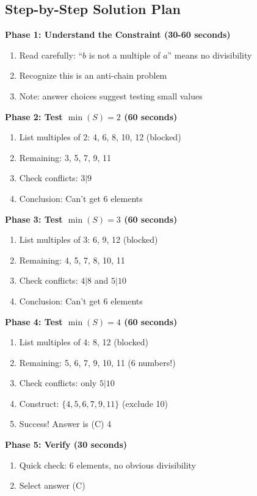 \documentclass[12pt]{article}
\begin{document}
\begin{roadmapbox}
\subsection*{Step-by-Step Solution Plan}

\textbf{Phase 1: Understand the Constraint (30-60 seconds)}
\begin{enumerate}
    \item Read carefully: ``$b$ is not a multiple of $a$'' means no divisibility
    \item Recognize this is an anti-chain problem
    \item Note: answer choices suggest testing small values
\end{enumerate}

\textbf{Phase 2: Test $\min(S) = 2$ (60 seconds)}
\begin{enumerate}
    \item List multiples of 2: 4, 6, 8, 10, 12 (blocked)
    \item Remaining: 3, 5, 7, 9, 11
    \item Check conflicts: $3|9$
    \item Conclusion: Can't get 6 elements
\end{enumerate}

\textbf{Phase 3: Test $\min(S) = 3$ (60 seconds)}
\begin{enumerate}
    \item List multiples of 3: 6, 9, 12 (blocked)
    \item Remaining: 4, 5, 7, 8, 10, 11
    \item Check conflicts: $4|8$ and $5|10$
    \item Conclusion: Can't get 6 elements
\end{enumerate}

\textbf{Phase 4: Test $\min(S) = 4$ (60 seconds)}
\begin{enumerate}
    \item List multiples of 4: 8, 12 (blocked)
    \item Remaining: 5, 6, 7, 9, 10, 11 (6 numbers!)
    \item Check conflicts: only $5|10$
    \item Construct: $\{4,5,6,7,9,11\}$ (exclude 10)
    \item Success! Answer is (C) 4
\end{enumerate}

\textbf{Phase 5: Verify (30 seconds)}
\begin{enumerate}
    \item Quick check: 6 elements, no obvious divisibility
    \item Select answer (C)
\end{enumerate}


\end{roadmapbox}
\end{document}
